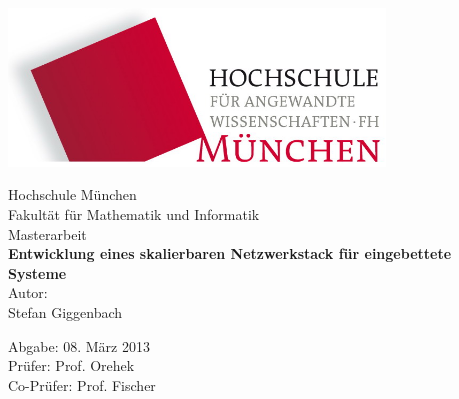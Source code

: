 %
\begin{flushright}
\includegraphics[width=0.75\textwidth]{img/hm.jpg}%
\end{flushright}


\vspace*{20mm}
\begin{center}
{\Large Hochschule München}\\
{\large Fakultät für Mathematik und Informatik}\\

\vspace*{15mm}
{\huge Masterarbeit }
\\

\vspace*{10mm}
{\huge \bfseries{ Entwicklung eines skalierbaren Netzwerkstack für eingebettete Systeme }} 
\\
\vspace*{15mm}
{\Large Autor: \\
Stefan Giggenbach
} 
\\
\end{center}

\vfill
{\large
Abgabe: 08. März 2013\\
Prüfer: Prof. Orehek\\
Co-Prüfer: Prof. Fischer}
\thispagestyle{empty}
\clearpage

\tableofcontents

\leereseite
